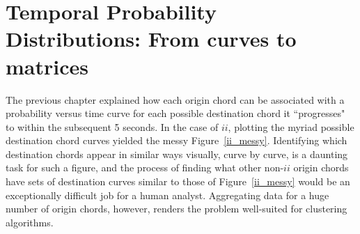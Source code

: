 \section{Temporal Probability Distributions: From curves to matrices}
The previous chapter explained how each origin chord can be associated with a probability versus time curve for each possible destination chord it ``progresses" to within the subsequent 5 seconds.  In the case of $ii$, plotting the myriad possible destination chord curves yielded the messy Figure~\ref{ii_messy}.  Identifying which destination chords appear in similar ways visually, curve by curve, is a daunting task for such a figure, and the process of finding what other non-$ii$ origin chords have sets of destination curves similar to those of Figure~\ref{ii_messy} would be an exceptionally difficult job for a human analyst.  Aggregating data for a huge number of origin chords, however, renders the problem well-suited for clustering algorithms.

